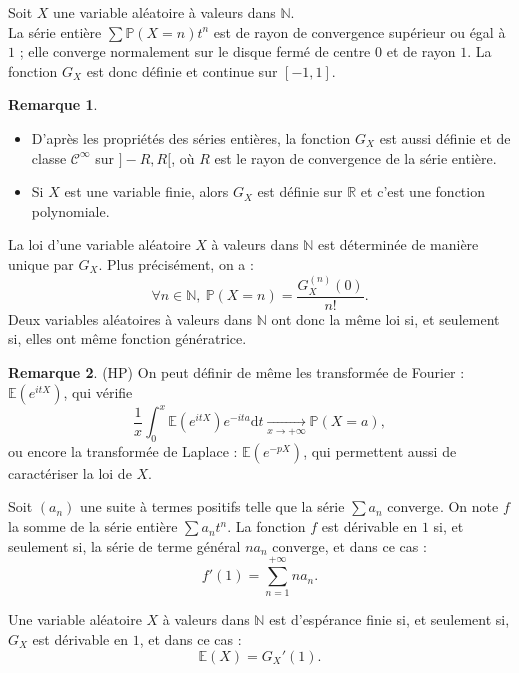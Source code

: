 \documentclass[french]{article}
\renewcommand{\P}{\mathbb{P}}
\newcommand{\N}{\mathbb{N}}
\newcommand{\R}{\mathbb{R}}
\newcommand{\E}{\mathbb{E}}
\renewcommand{\d}{\text{d}}
\theoremstyle{plain}
\theoremstyle{definition}
\newtheorem*{rmq}{Remarque}
\theoremstyle{remark}
\begin{document}
\begin{thm}{}%
	Soit $X$ une variable aléatoire à valeurs dans $\N$.\\
	La série entière $\displaystyle\sum\P(X=n)t^n$ est de rayon de convergence supérieur ou égal à $1$ ; elle converge normalement sur le disque fermé de centre $0$ et de rayon $1$. La fonction $G_X$ est donc définie et continue sur $[-1,1]$.
\end{thm}

\begin{rmq}
	\begin{itemize}
		\item D'après les propriétés des séries entières, la fonction $G_X$ est aussi définie et de classe $\mathcal{C}^\infty$ sur $]-R,R[$, où $R$ est le rayon de convergence de la série entière.
		\item Si $X$ est une variable finie, alors $G_X$ est définie sur $\R$ et c'est une fonction polynomiale.
	\end{itemize}
\end{rmq}

\begin{thm}{}%
	La loi d'une variable aléatoire $X$ à valeurs dans $\N$ est déterminée de manière unique par $G_X$. Plus précisément, on a :
	$$\forall n\in\N,\ \P(X=n)=\frac{G_X^{(n)}(0)}{n!}.$$
	Deux variables aléatoires à valeurs dans $\N$ ont donc la même loi si, et seulement si, elles ont même fonction génératrice.
\end{thm}

\begin{rmq}{(HP)}
	On peut définir de même les transformée de Fourier : $\E(e^{itX})$, qui vérifie $$\frac{1}{x}\int_{0}^{x}\E(e^{itX})e^{-ita}\d t\xrightarrow[x\to+\infty]{}\P(X=a),$$ ou encore la transformée de Laplace : $\E(e^{-pX})$, qui permettent aussi de caractériser la loi de $X$.
\end{rmq}

\begin{thm}{}%
	Soit $(a_n)$ une suite à termes positifs telle que la série $\displaystyle\sum a_n$ converge. On note $f$ la somme de la série entière $\displaystyle\sum a_nt^n$. La fonction $f$ est dérivable en $1$ si, et seulement si, la série de terme général $na_n$ converge, et dans ce cas : 
	$$f'(1)=\sum_{n=1}^{+\infty}na_n.$$
\end{thm}

\begin{thm}{}%
	Une variable aléatoire $X$ à valeurs dans $\N$ est d'espérance finie si, et seulement si, $G_X$ est dérivable en $1$, et dans ce cas : $$\E(X)=G_X'(1).$$
\end{thm}
\end{document}
